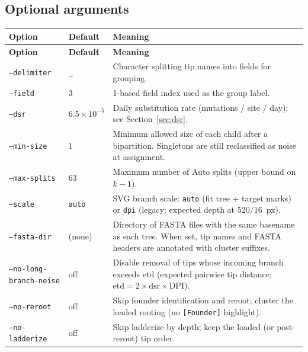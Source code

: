 \documentclass[11pt,a4paper]{article}
\begin{document}
\subsection{Optional arguments}
\begin{longtable}{@{}p{3.6cm}p{2.4cm}p{8cm}@{}}
\toprule
\textbf{Option} & \textbf{Default} & \textbf{Meaning} \\
\midrule
\endfirsthead
\toprule
\textbf{Option} & \textbf{Default} & \textbf{Meaning} \\
\midrule
\endhead
\texttt{--delimiter} & \texttt{\_} &
  Character splitting tip names into fields for grouping. \\
\texttt{--field} & $3$ &
  1-based field index used as the group label. \\
\texttt{--dsr} & $6.5\times10^{-5}$ &
  Daily substitution rate (mutations / site / day);
  see Section~\ref{sec:dsr}. \\
\texttt{--min-size} & $1$ &
  Minimum allowed size of each child after a bipartition.
  Singletons are still reclassified as noise at assignment. \\
\texttt{--max-splits} & $63$ &
  Maximum number of Auto splits (upper bound on $k-1$). \\
\texttt{--scale} & \texttt{auto} &
  SVG branch scale: \texttt{auto} (fit tree + target marks) or
  \texttt{dpi} (legacy: expected depth at $520/16$~px). \\
\texttt{--fasta-dir} & (none) &
  Directory of FASTA files with the same basename as each tree.
  When set, tip names and FASTA headers are annotated with cluster suffixes. \\
\texttt{--no-long-branch-noise} & off &
  Disable removal of tips whose incoming branch exceeds
  $\mathrm{etd}$ (expected pairwise tip distance;
  $\mathrm{etd}=2\times\mathrm{dsr}\times\mathrm{DPI}$). \\
\texttt{--no-reroot} & off &
  Skip founder identification and reroot; cluster the loaded rooting
  (no \texttt{[Founder]} highlight). \\
\texttt{--no-ladderize} & off &
  Skip ladderize by depth; keep the loaded (or post-reroot) tip order. \\
\bottomrule
\end{longtable}
\end{document}

